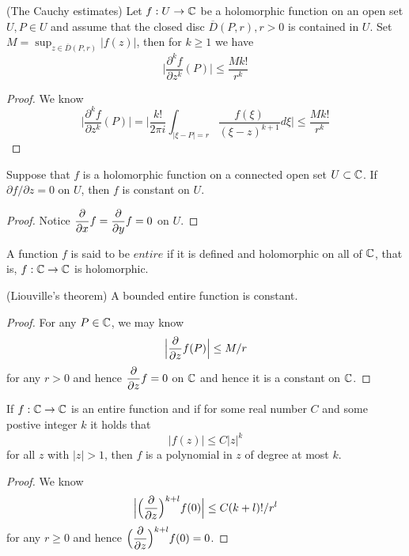 \begin{theorem}
    (The Cauchy estimates) Let $f:U\to\mathbb{C}$ be a holomorphic function on an open set $U,P\in U$ and assume that the closed disc $\overline{D}(P,r),r>0$ is contained in $U$. Set $M = \sup_{z\in \overline{D}(P,r)}|f(z)|$, then for $k\geq 1$ we have
    \[
    \Big|\dfrac{\partial^k f}{\partial z^k}(P) \Big| \leq \dfrac{Mk!}{r^k}
    \]
\end{theorem}
\begin{proof}\par
    We know
    \[
    \Big|\dfrac{\partial^k f}{\partial z^k}(P) \Big| = \Big|\dfrac{k!}{2\pi i}\int_{|\xi-P| = r}\dfrac{f(\xi)}{(\xi-z)^{k+1}}d\xi \Big| \leq \dfrac{Mk!}{r^k} 
    \]
\end{proof}

\begin{lemma}
    Suppose that $f$ is a holomorphic function on a connected open set $U\subset\mathbb{C}$. If $\partial f/\partial z = 0$ on $U$, then $f$ is constant on $U$.
\end{lemma}
\begin{proof}
    Notice $\dfrac{\partial}{\partial x} f = \dfrac{\partial}{\partial y} f =0$ on $U$.
\end{proof}

\begin{definition}
    A function $f$ is said to be $entire$ if it is defined and holomorphic on all of $\mathbb{C}$, that is, $f:\mathbb{C}\to\mathbb{C}$ is holomorphic.
\end{definition}

\begin{theorem}
    (Liouville's theorem) A bounded entire function is constant.
\end{theorem}
\begin{proof}
    For any $P\in\mathbb{C}$, we may know
    \[
    \Big|\dfrac{\partial}{\partial z} f(P)\Big| \leq M/r
    \]
    for any $r>0$ and hence $\dfrac{\partial}{\partial z} f = 0$ on $\mathbb{C}$ and hence it is a constant on $\mathbb{C}$.
\end{proof}

\begin{theorem}
    If $f:\mathbb{C}\to\mathbb{C}$ is an entire function and if for some real number $C$ and some postive integer $k$ it holds that
    \[|f(z)|\leq C|z|^k\]
    for all $z$ with $|z|>1$, then $f$ is a polynomial in $z$ of degree at most $k$.
\end{theorem}
\begin{proof}
    We know
    \[
    \Big|\Big(\dfrac{\partial}{\partial z}\Big)^{k+l} f(0)\Big| \leq C(k+l)!/r^l 
    \]
    for any $r\geq 0$ and hence $\Big(\dfrac{\partial}{\partial z}\Big)^{k+l} f(0) = 0$.
\end{proof}

